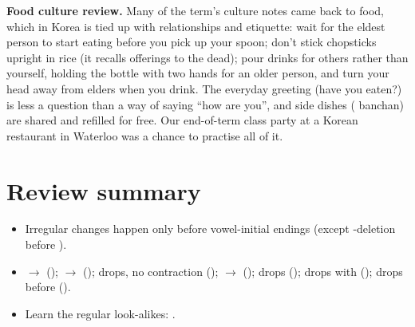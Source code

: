 \begin{aside}
\textbf{Food culture review.} Many of the term's culture notes came back to food, which
in Korea is tied up with relationships and etiquette: wait for the eldest person to
start eating before you pick up your spoon; don't stick chopsticks upright in rice (it
recalls offerings to the dead); pour drinks for others rather than yourself, holding the
bottle with two hands for an older person, and turn your head away from elders when you
drink. The everyday greeting  (have you eaten?) is less a question than
a way of saying ``how are you'', and side dishes ( banchan) are shared and
refilled for free. Our end-of-term class party at a Korean restaurant in Waterloo was a
chance to practise all of it.
\end{aside}

\section*{Review summary}
\begin{itemize}
  \item Irregular changes happen only before vowel-initial endings (except
        -deletion before ).
  \item {} $\to$  ();  $\to$  ();
         drops, no contraction ();  $\to$ 
        ();  drops ();  drops with 
        ();  drops before  ().
  \item Learn the regular look-alikes: .
\end{itemize}
